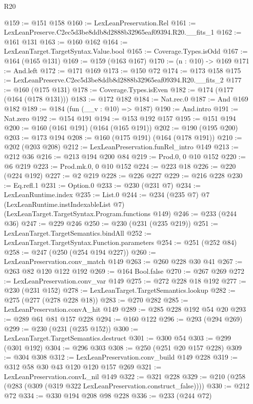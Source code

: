 \begin{lexlean}{R20}
\begin{coremodule}
@159 := @151 @158
@160 := LexLeanPreservation.Rel
@161 := LexLeanPreserve.C2ec5d3be8ddb8d2888b32965eaf09394.R20.__fits_1
@162 := @161 @131
@163 := @160 @162
@164 := LexLeanTarget.TargetSyntax.Value.bool
@165 := Coverage.Types.isOdd
@167 := @164 (@165 @131)
@169 := @159 (@163 @167)
@170 := (n : @10) -> @169
@171 := And.left
@172 := @171 @169
@173 := @150 @72
@174 := @173 @158
@175 := LexLeanPreserve.C2ec5d3be8ddb8d2888b32965eaf09394.R20.__fits_2
@177 := @160 (@175 @131)
@178 := Coverage.Types.isEven
@182 := @174 (@177 (@164 (@178 @131)))
@183 := @172 @182
@184 := Nat.rec.{0}
@187 := And @169 @182
@189 := @184 (fun (__v : @10) => @187)
@190 := And.intro
@191 := Nat.zero
@192 := @154 @191
@194 := @153 @192 @157
@195 := @151 @194
@200 := @160 (@161 @191) (@164 (@165 @191))
@202 := @190 (@195 @200)
@203 := @173 @194
@208 := @160 (@175 @191) (@164 (@178 @191))
@210 := @202 (@203 @208)
@212 := LexLeanPreservation.funRel_intro @149
@213 := @212 @36
@216 := @213 @194 @200 @84
@219 := Prod.{0, 0} @10 @152
@220 := @6 @219
@223 := Prod.mk.{0, 0} @10 @152
@224 := @223 @18
@226 := @220 (@224 @192)
@227 := @2 @219
@228 := @226 @227
@229 := @216 @228
@230 := Eq.refl.{1}
@231 := Option.{0}
@233 := @230 (@231 @7)
@234 := LexLeanRuntime.index
@235 := List.{0}
@244 := @234
    (@235 @7)
    @7
    (LexLeanRuntime.instIndexableList @7)
    (LexLeanTarget.TargetSyntax.Program.functions @149)
@246 := @233 (@244 @36)
@247 := @229 @246
@250 := @230 (@231 (@235 @219))
@251 := LexLeanTarget.TargetSemantics.bindAll
@252 := LexLeanTarget.TargetSyntax.Function.parameters
@254 := @251 (@252 @84)
@258 := @247 (@250 (@254 @194 @227))
@260 := LexLeanPreservation.conv_match @149
@263 := @260 @228 @30 @41
@267 := @263 @82 @120 @122 @192
@269 := @164 Bool.false
@270 := @267 @269
@272 := LexLeanPreservation.conv_var @149
@275 := @272 @228 @18 @192
@277 := @230 (@231 @152)
@278 := LexLeanTarget.TargetSemantics.lookup
@282 := @275 (@277 (@278 @228 @18))
@283 := @270 @282
@285 := LexLeanPreservation.convA_hit @149
@289 := @285 @228 @192 @54 @20
@293 := @289 @61 @81 @157 @228
@294 := @160 @122
@296 := @293 (@294 @269)
@299 := @230 (@231 (@235 @152))
@300 := LexLeanTarget.TargetSemantics.destruct
@301 := @300 @54
@303 := @299 (@301 @192)
@304 := @296 @303
@308 := @250 (@251 @20 @157 @228)
@309 := @304 @308
@312 := LexLeanPreservation.conv_build @149 @228
@319 := @312 @58 @30 @43 @120 @120 @157 @269
@321 := LexLeanPreservation.convL_nil @149
@322 := @321 @228
@329 := @210 (@258 (@283 (@309 (@319 @322 LexLeanPreservation.construct_false))))
@330 := @212 @72
@334 := @330 @194 @208 @98 @228
@336 := @233 (@244 @72)

\end{coremodule}
\end{lexlean}
